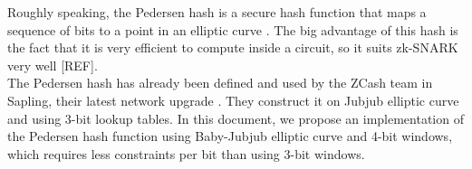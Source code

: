 	Roughly speaking, the Pedersen hash is a secure hash function that maps a sequence of bits to a point in %
	an elliptic curve \cite{pedersen-gen}. The big advantage of %
	this hash is the fact that it is very efficient to compute inside a circuit, so it suits zk-SNARK very well [REF]. \\

	The Pedersen hash has already been defined and used by the ZCash team in Sapling, their latest network upgrade \cite{sapling}. They construct it on Jubjub elliptic curve and using 3-bit lookup tables. In this document, we propose an implementation of the Pedersen hash function using Baby-Jubjub elliptic curve and 4-bit windows, which requires less constraints per bit than using 3-bit windows. \\
